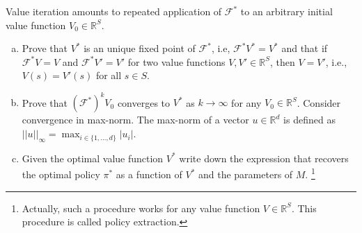 \documentclass[12pt]{article}
\begin{document}
Value iteration amounts to repeated application of $\mathcal F ^*$ to an 
arbitrary initial value function $V _0 \in \mathbb R ^ { S }$. 
\begin{enumerate}[a)]
  \item Prove that $V ^*$ is an unique fixed point of $\mathcal F ^*$, i.e, 
    $\mathcal F ^* V ^* = V ^*$ and that if 
    $\mathcal F ^* V = V$ and $\mathcal F ^* V ' = V '$ 
    for two value functions $V, V' \in \mathbb R ^S$, 
    then $V = V'$, i.e., $V(s) = V'(s)$ for all $s \in S$.
  \item Prove that $(\mathcal F ^*) ^ k V _0$ converges to $V ^*$ as $k \to \infty$
    for any $V _0 \in \mathbb R ^ S$. 
    Consider convergence in max-norm. The max-norm of a vector 
    $u \in \mathbb R ^d $ is defined as  
    ${ || u || } _\infty = \max _{i \in \{1, \ldots, d \} }{ | u _i | }$. 
  \item Given the optimal value function $V ^*$ 
    write down the expression that recovers the optimal policy $\pi ^*$ as a 
    function of $V ^*$ and the parameters of $M$.
    \footnote{Actually, such a procedure works for any value function $V \in \mathbb R ^S$. 
    This procedure is called policy extraction.}
\end{enumerate}

\end{document}
